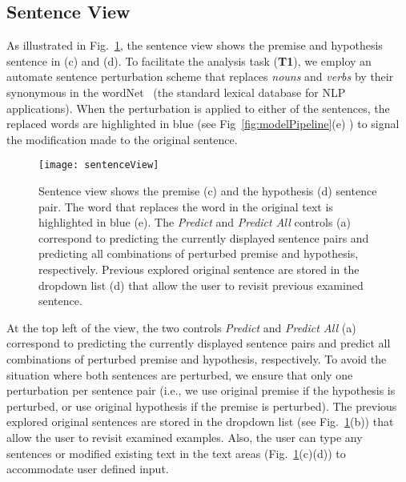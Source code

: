 \subsection{Sentence View}
\label{sec:sentence}
As illustrated in Fig.~\ref{fig:sentenceView}, the sentence view shows the premise and hypothesis sentence in (c) and (d).
%
To facilitate the analysis task (\textbf{T1}), we employ an automate sentence perturbation scheme that replaces \emph{nouns} and \emph{verbs} by their synonymous in the wordNet~\cite{Miller1995} (the standard lexical database for NLP applications).
%
When the perturbation is applied to either of the sentences, the replaced words are highlighted in blue (see Fig~\ref{fig:modelPipeline}(e) ) to signal the modification made to the original sentence.

\begin{figure}[htbp]
\centering
\vspace{-2mm}
 \texttt{[image: sentenceView]}
 \vspace{-2mm}
 \caption{
 Sentence view shows the premise (c) and the hypothesis (d) sentence pair. The word that replaces the word in the original text is highlighted in blue (e).
 The \emph{Predict} and \emph{Predict All} controls (a) correspond to predicting the currently displayed sentence pairs and predicting all combinations of perturbed premise and hypothesis, respectively.
 Previous explored original sentence are stored in the dropdown list (d) that allow the user to revisit previous examined sentence.
}
\label{fig:sentenceView}
\end{figure}

At the top left of the view, the two controls \emph{Predict} and \emph{Predict All} (a) correspond to predicting the currently displayed sentence pairs and predict all combinations of perturbed premise and hypothesis, respectively.
%
To avoid the situation where both sentences are perturbed, we ensure that only one perturbation per sentence pair (i.e., we use original premise if the hypothesis is perturbed, or use original hypothesis if the premise is perturbed).
The previous explored original sentences are stored in the dropdown list (see Fig.~\ref{fig:sentenceView}(b)) that allow the user to revisit examined examples.
Also, the user can type any sentences or modified existing text in the text areas (Fig.~\ref{fig:sentenceView}(c)(d)) to accommodate user defined input.



